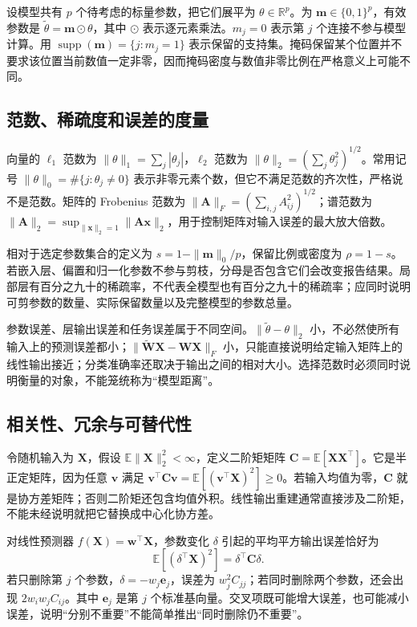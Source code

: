 \documentclass[UTF8,12pt,a4paper,fontset=fandol]{ctexart}
\begin{document}
设模型共有 $p$ 个待考虑的标量参数，把它们展平为 $\theta\in\mathbb R^p$。为 $\mathbf m\in\{0,1\}^p$，有效参数是 $\widetilde\theta=\mathbf m\odot\theta$，其中 $\odot$ 表示逐元素乘法。$m_j=0$ 表示第 $j$ 个连接不参与模型计算。用 $\operatorname{supp}(\mathbf m)=\{j:m_j=1\}$ 表示保留的支持集。掩码保留某个位置并不要求该位置当前数值一定非零，因而掩码密度与数值非零比例在严格意义上可能不同。

\subsection{范数、稀疏度和误差的度量}
向量的 $\ell_1$ 范数为 $\|\theta\|_1=\sum_j|\theta_j|$，$\ell_2$ 范数为 $\|\theta\|_2=(\sum_j\theta_j^2)^{1/2}$。常用记号 $\|\theta\|_0=\#\{j:\theta_j\ne0\}$ 表示非零元素个数，但它不满足范数的齐次性，严格说不是范数。矩阵的 Frobenius 范数为 $\|\mathbf A\|_F=(\sum_{i,j}A_{ij}^2)^{1/2}$；谱范数为 $\|\mathbf A\|_2=\sup_{\|\mathbf x\|_2=1}\|\mathbf A\mathbf x\|_2$，用于控制矩阵对输入误差的最大放大倍数。

相对于选定参数集合的定义为 $s=1-\|\mathbf m\|_0/p$，保留比例或密度为 $\rho=1-s$。若嵌入层、偏置和归一化参数不参与剪枝，分母是否包含它们会改变报告结果。局部层有百分之九十的稀疏率，不代表全模型也有百分之九十的稀疏率；应同时说明可剪参数的数量、实际保留数量以及完整模型的参数总量。

参数误差、层输出误差和任务误差属于不同空间。$\|\widetilde\theta-\theta\|_2$ 小，不必然使所有输入上的预测误差都小；$\|\widetilde{\mathbf W}\mathbf X-\mathbf W\mathbf X\|_F$ 小，只能直接说明给定输入矩阵上的线性输出接近；分类准确率还取决于输出之间的相对大小。选择范数时必须同时说明衡量的对象，不能笼统称为“模型距离”。

\subsection{相关性、冗余与可替代性}
令随机输入为 $\mathbf X$，假设 $\mathbb E\|\mathbf X\|_2^2<\infty$，定义二阶矩矩阵 $\mathbf C=\mathbb E[\mathbf X\mathbf X^\top]$。它是半正定矩阵，因为任意 $\mathbf v$ 满足 $\mathbf v^\top\mathbf C\mathbf v=\mathbb E[(\mathbf v^\top\mathbf X)^2]\geq0$。若输入均值为零，$\mathbf C$ 就是协方差矩阵；否则二阶矩还包含均值外积。线性输出重建通常直接涉及二阶矩，不能未经说明就把它替换成中心化协方差。

对线性预测器 $f(\mathbf X)=\mathbf w^\top\mathbf X$，参数变化 $\delta$ 引起的平均平方输出误差恰好为
\begin{equation}
 \mathbb E[(\delta^\top\mathbf X)^2]=\delta^\top\mathbf C\delta.
 \label{eq:prune-linear-error}
\end{equation}
若只删除第 $j$ 个参数，$\delta=-w_j\mathbf e_j$，误差为 $w_j^2C_{jj}$；若同时删除两个参数，还会出现 $2w_iw_jC_{ij}$。其中 $\mathbf e_j$ 是第 $j$ 个标准基向量。交叉项既可能增大误差，也可能减小误差，说明“分别不重要”不能简单推出“同时删除仍不重要”。
\end{document}
